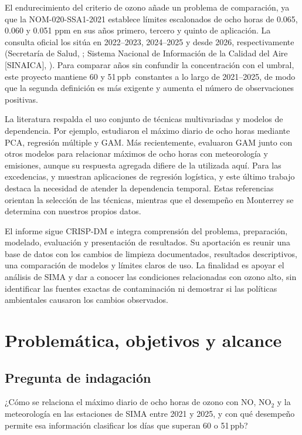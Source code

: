 \documentclass[11pt,letterpaper]{article}
\newcommand{\ppb}{\,ppb}
\begin{document}
El endurecimiento del criterio de ozono añade un problema de comparación, ya que la NOM-020-SSA1-2021 establece límites escalonados de ocho horas de 0.065, 0.060 y 0.051 ppm en sus años primero, tercero y quinto de aplicación. La consulta oficial los sitúa en 2022--2023, 2024--2025 y desde 2026, respectivamente (Secretaría de Salud, \citeyear{salud2021}; Sistema Nacional de Información de la Calidad del Aire [SINAICA], \citeyear{sinaica}). Para comparar años sin confundir la concentración con el umbral, este proyecto mantiene 60 y 51\ppb\ constantes a lo largo de 2021--2025, de modo que la segunda definición es más exigente y aumenta el número de observaciones positivas.

La literatura respalda el uso conjunto de técnicas multivariadas y modelos de dependencia. Por ejemplo, \citet{laban2020} estudiaron el máximo diario de ocho horas mediante PCA, regresión múltiple y GAM. Más recientemente, \citet{gao2022} evaluaron GAM junto con otros modelos para relacionar máximos de ocho horas con meteorología y emisiones, aunque su respuesta agregada difiere de la utilizada aquí. Para las excedencias, \citet{otero2016} y \citet{chang2025} muestran aplicaciones de regresión logística, y este último trabajo destaca la necesidad de atender la dependencia temporal. Estas referencias orientan la selección de las técnicas, mientras que el desempeño en Monterrey se determina con nuestros propios datos.

El informe sigue CRISP-DM e integra comprensión del problema, preparación, modelado, evaluación y presentación de resultados. Su aportación es reunir una base de datos con los cambios de limpieza documentados, resultados descriptivos, una comparación de modelos y límites claros de uso. La finalidad es apoyar el análisis de SIMA y dar a conocer las condiciones relacionadas con ozono alto, sin identificar las fuentes exactas de contaminación ni demostrar si las políticas ambientales causaron los cambios observados.
\clearpage

\section{Problemática, objetivos y alcance}
\subsection{Pregunta de indagación}
¿Cómo se relaciona el máximo diario de ocho horas de ozono con NO, NO$_2$ y la meteorología en las estaciones de SIMA entre 2021 y 2025, y con qué desempeño permite esa información clasificar los días que superan 60 o 51\ppb?
\end{document}
